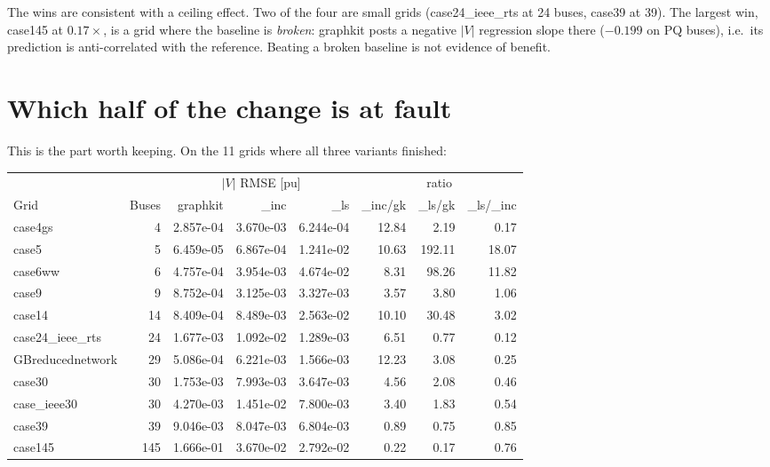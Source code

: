 \documentclass[10pt]{article}
\begin{document}
The wins are consistent with a ceiling effect. Two of the four are small grids
(case24\_ieee\_rts at 24 buses, case39 at 39). The largest win, case145 at
$0.17\times$, is a grid where the baseline is \emph{broken}: graphkit posts a
negative $|V|$ regression slope there ($-0.199$ on PQ buses), i.e.\ its
prediction is anti-correlated with the reference. Beating a broken baseline is
not evidence of benefit.

\section{Which half of the change is at fault}

This is the part worth keeping. On the 11 grids where all three variants
finished:

\begin{table}[H]
\centering\scriptsize
\begin{tabular}{lrrrrrrr}
\toprule
 & & \multicolumn{3}{c}{$|V|$ RMSE [pu]} & \multicolumn{3}{c}{ratio} \\
\cmidrule(lr){3-5}\cmidrule(lr){6-8}
Grid & Buses & graphkit & \_inc & \_ls & \_inc/gk & \_ls/gk & \_ls/\_inc \\
\midrule
case4gs & 4 & 2.857e-04 & 3.670e-03 & 6.244e-04 & 12.84 & 2.19 & 0.17 \\
case5 & 5 & 6.459e-05 & 6.867e-04 & 1.241e-02 & 10.63 & 192.11 & 18.07 \\
case6ww & 6 & 4.757e-04 & 3.954e-03 & 4.674e-02 & 8.31 & 98.26 & 11.82 \\
case9 & 9 & 8.752e-04 & 3.125e-03 & 3.327e-03 & 3.57 & 3.80 & 1.06 \\
case14 & 14 & 8.409e-04 & 8.489e-03 & 2.563e-02 & 10.10 & 30.48 & 3.02 \\
case24\_ieee\_rts & 24 & 1.677e-03 & 1.092e-02 & 1.289e-03 & 6.51 & 0.77 & 0.12 \\
GBreducednetwork & 29 & 5.086e-04 & 6.221e-03 & 1.566e-03 & 12.23 & 3.08 & 0.25 \\
case30 & 30 & 1.753e-03 & 7.993e-03 & 3.647e-03 & 4.56 & 2.08 & 0.46 \\
case\_ieee30 & 30 & 4.270e-03 & 1.451e-02 & 7.800e-03 & 3.40 & 1.83 & 0.54 \\
case39 & 39 & 9.046e-03 & 8.047e-03 & 6.804e-03 & 0.89 & 0.75 & 0.85 \\
case145 & 145 & 1.666e-01 & 3.670e-02 & 2.792e-02 & 0.22 & 0.17 & 0.76 \\
\bottomrule
\end{tabular}
\end{table}
\end{document}
